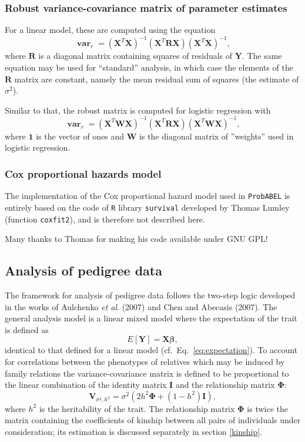 \documentclass[12pt,a4paper]{article}
\DeclareMathOperator{\var}{\mathbf{var}}
\newcommand{\PA}{\texttt{ProbABEL}}
\begin{document}
\subsubsection{Robust variance-covariance matrix of parameter estimates}
For a linear model, these are computed using the equation
$$
\var_r = (\mathbf{X}^T\mathbf{X})^{-1} (\mathbf{X}^T\mathbf{R}\mathbf{X})
(\mathbf{X}^T\mathbf{X})^{-1},
$$
where $\mathbf{R}$ is a diagonal matrix containing squares of residuals
of $\mathbf{Y}$. The
same equation may be used for ``standard'' analysis, in which case
the elements of the $\mathbf{R}$ matrix are constant, namely the mean
residual sum of squares (the estimate of $\sigma^2$).

Similar to that, the robust matrix is computed for logistic regression with
$$
\var_r = (\mathbf{X}^T \mathbf{W} \mathbf{X})^{-1} (\mathbf{X}^T\mathbf{R}\mathbf{X})
(\mathbf{X}^T \mathbf{W} \mathbf{X})^{-1},
$$
where $\mathbf{1}$ is the vector of ones and $\mathbf{W}$ is the diagonal matrix
of ''weights'' used in logistic regression.


\subsubsection{Cox proportional hazards model}
The implementation of the Cox proportional hazard model used
in \PA{} is entirely based on the code of \texttt{R}
library \texttt{survival} developed by Thomas Lumley
(function \texttt{coxfit2}), and is therefore not described here.

Many thanks to Thomas for making his code available under GNU GPL!

\subsection{Analysis of pedigree data}
The framework for analysis of pedigree data follows the two-step logic
developed in the works of Aulchenko \emph{et al}. (2007) and Chen and
Abecasis (2007). The general analysis model is a linear mixed model
where the expectation of the trait is defined as
$$
E[\mathbf{Y}] = \mathbf{X} \boldsymbol{\beta},
$$
identical to that defined for a linear model
(cf.~Eq.~\ref{eq:expectation}). To account for correlations between
the phenotypes of relatives which may be induced by family relations
the variance-covariance matrix is defined to be proportional to the
linear combination of the identity matrix $\mathbf{I}$ and the
relationship matrix $\boldsymbol{\Phi}$:
$$
\mathbf{V}_{\sigma^2,h^2} = \sigma^2 \left( 2 h^2 \boldsymbol{\Phi} + (1-h^2)
\mathbf{I} \right),
$$
where $h^2$ is the heritability of the trait. The relationship matrix
$\boldsymbol{\Phi}$ is twice the matrix containing the coefficients of
kinship between all pairs of individuals under consideration; its
estimation is discussed separately in section \ref{kinship}.
\end{document}
